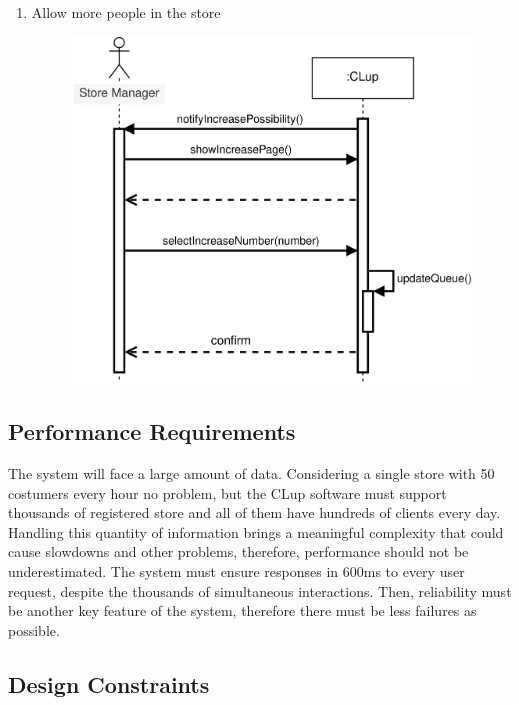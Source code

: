 \documentclass[]{article}
\begin{document}
\begin{enumerate}
						\item Allow more people in the store
							\begin{figure}[H]
								\centering
								\includegraphics[]{AllowMorePPlDiagram.png}
								\caption{}
								\label{fig:buildstats_sequencediagram}
							\end{figure}
						
						\newpage
						\end{enumerate}
		
		\subsection{Performance Requirements}
		
		The system will face a large amount of data. Considering a single store with 50 costumers every hour no problem, but the CLup software must support thousands of registered store and all of them have hundreds of clients every day. Handling this quantity of information brings a meaningful complexity that could cause slowdowns and other problems, therefore, performance should not be underestimated. The system must ensure responses in 600ms to every user request, despite the thousands of simultaneous interactions. 
		Then, reliability must be another key feature of the system, therefore there must be less failures as possible.
		
		\bigskip\bigskip
		
		\subsection{Design Constraints}
		
\end{document}
